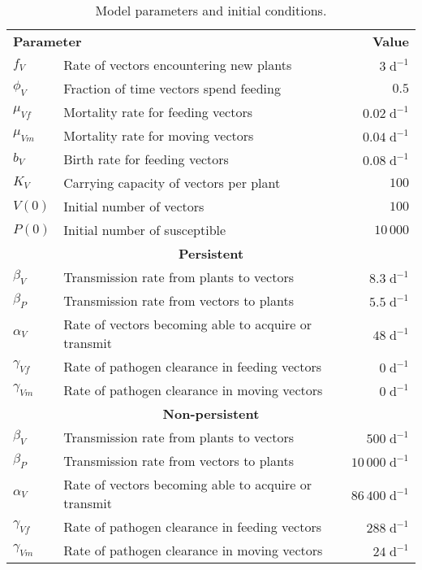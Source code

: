 \documentclass{article}
\begin{document}
\begin{table}
  \centering
  \begin{tabular}{llr}
    \multicolumn{2}{l}{\textbf{Parameter}}
    & \multicolumn{1}{r}{\textbf{Value}}
    \\
    $f_V$ & Rate of vectors encountering new plants & $3\;\text{d}^{-1}$
    \\
    $\phi_V$ & Fraction of time vectors spend feeding & $0.5$
    \\
    $\mu_{Vf}$ & Mortality rate for feeding vectors & $0.02\;\text{d}^{-1}$
    \\
    $\mu_{Vm}$ & Mortality rate for moving vectors & $0.04\;\text{d}^{-1}$
    \\
    $b_V$ & Birth rate for feeding vectors & $0.08\;\text{d}^{-1}$
    \\
    $K_V$ & Carrying capacity of vectors per plant & $100$
    \\
    $V(0)$ & Initial number of vectors & $100$
    \\
    $P(0)$ & Initial number of susceptible & $10\,000$
    \\
    \multicolumn{3}{c}{\textbf{Persistent}}
    \\
    $\beta_V$ & Transmission rate from plants to vectors & $8.3\;\text{d}^{-1}$
    \\
    $\beta_P$ & Transmission rate from vectors to plants & $5.5\;\text{d}^{-1}$
    \\
    $\alpha_V$ & Rate of vectors becoming able to acquire or transmit & $48\;\text{d}^{-1}$
    \\
    $\gamma_{Vf}$ & Rate of pathogen clearance in feeding vectors & $0\;\text{d}^{-1}$
    \\
    $\gamma_{Vm}$ & Rate of pathogen clearance in moving vectors & $0\;\text{d}^{-1}$
    \\
    \multicolumn{3}{c}{\textbf{Non-persistent}}
    \\
    $\beta_V$ & Transmission rate from plants to vectors & $500\;\text{d}^{-1}$
    \\
    $\beta_P$ & Transmission rate from vectors to plants & $10\,000\;\text{d}^{-1}$
    \\
    $\alpha_V$ & Rate of vectors becoming able to acquire or transmit & $86\,400\;\text{d}^{-1}$
    \\
    $\gamma_{Vf}$ & Rate of pathogen clearance in feeding vectors & $288\;\text{d}^{-1}$ \\
    $\gamma_{Vm}$ & Rate of pathogen clearance in moving vectors & $24\;\text{d}^{-1}$
  \end{tabular}
  \caption{Model parameters and initial conditions.}
  \label{params}
\end{table}
\end{document}
